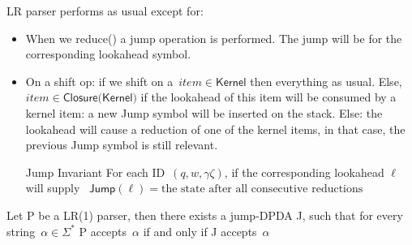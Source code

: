 LR parser performs as usual except for:

\begin{itemize}
	\item When we \textsf{reduce()} a jump operation is performed.
	  The jump will be for the corresponding lookahead symbol.
	  
	\item On a shift op:
	if we shift on a~$item \in \textsf{Kernel}$
	  then everything as usual.
	Else,~$item \in \textsf{Closure(Kernel)}$
	    if the lookahead of this item will be consumed by a kernel item:
	      a new Jump symbol will be inserted on the stack.
	    Else:
	      the lookahead will cause a reduction of one of the kernel items,
	      in that case, the previous Jump symbol is still relevant.
	\item[Jump Invariant] For each ID~$(q,w,\gamma \zeta)$, if the corresponding lookahead $\ell$ will supply
	  ~$\textsf{Jump}(\ell)= \text{the state after all consecutive reductions}$
\end{itemize}

\begin{Definition}
	Let P be a LR(1) parser, then there exists a jump-DPDA J,
	such that for every string~$\alpha \in \Sigma ^ *$
	P accepts~$\alpha$ if and only if J accepts~$\alpha$ 
\end{Definition}